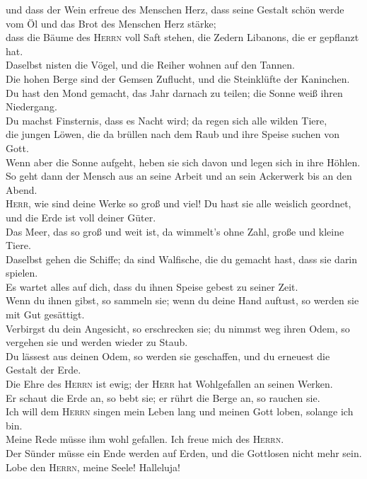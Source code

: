  und dass der Wein erfreue des Menschen Herz, dass seine
Gestalt schön werde vom Öl und das Brot des Menschen Herz stärke;\\
 dass die Bäume des \textsc{Herrn} voll Saft stehen, die
Zedern Libanons, die er gepflanzt hat.\\
 Daselbst nisten die Vögel, und die Reiher wohnen auf den
Tannen.\\
 Die hohen Berge sind der Gemsen Zuflucht, und die
Steinklüfte der Kaninchen.\\
 Du hast den Mond gemacht, das Jahr darnach zu teilen;
die Sonne weiß ihren Niedergang.\\
 Du machst Finsternis, dass es Nacht wird; da regen sich
alle wilden Tiere,\\
 die jungen Löwen, die da brüllen nach dem Raub und ihre
Speise suchen von Gott.\\
 Wenn aber die Sonne aufgeht, heben sie sich davon und
legen sich in ihre Höhlen.\\
 So geht dann der Mensch aus an seine Arbeit und an sein
Ackerwerk bis an den Abend.\\
 \textsc{Herr}, wie sind deine Werke so groß und viel! Du
hast sie alle weislich geordnet, und die Erde ist voll deiner Güter.\\
 Das Meer, das so groß und weit ist, da wimmelt's ohne
Zahl, große und kleine Tiere.\\
 Daselbst gehen die Schiffe; da sind Walfische, die du
gemacht hast, dass sie darin spielen.\\
 Es wartet alles auf dich, dass du ihnen Speise gebest zu
seiner Zeit.\\
 Wenn du ihnen gibst, so sammeln sie; wenn du deine Hand
auftust, so werden sie mit Gut gesättigt.\\
 Verbirgst du dein Angesicht, so erschrecken sie; du
nimmst weg ihren Odem, so vergehen sie und werden wieder zu Staub.\\
 Du lässest aus deinen Odem, so werden sie geschaffen,
und du erneuest die Gestalt der Erde.\\
 Die Ehre des \textsc{Herrn} ist ewig; der \textsc{Herr}
hat Wohlgefallen an seinen Werken.\\
 Er schaut die Erde an, so bebt sie; er rührt die Berge
an, so rauchen sie.\\
 Ich will dem \textsc{Herrn} singen mein Leben lang und
meinen Gott loben, solange ich bin.\\
 Meine Rede müsse ihm wohl gefallen. Ich freue mich des
\textsc{Herrn}.\\
 Der Sünder müsse ein Ende werden auf Erden, und die
Gottlosen nicht mehr sein. Lobe den \textsc{Herrn}, meine Seele!
Halleluja!

